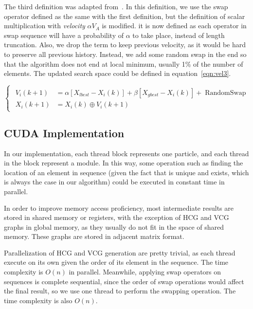 \documentclass{article}
\begin{document}
The third definition was adapted from~\cite{1259748}. In this definition, we use the swap operator defined as the same with the first definition, but the definition of scalar multiplication with \textit{velocity} $\alpha V_A$ is modified. it is now defined as each operator in swap sequence will have a probability of $\alpha$ to take place, instead of length truncation. Also, we drop the term to keep previous velocity, as it would be hard 
to preserve all previous history. Instead, we add some random swap in the end so that the algorithm does not end at local minimum, usually 1\% of the number of elements. The updated search space could be defined in equation~\ref{eqn:vel3}.

\begin{equation}
\label{eqn:vel3}
    \begin{cases}
        \begin{split}
        V_i(k+1) &= \alpha [X_{lbest}-X_i(k)]+\beta [X_{gbest}-X_i(k)]+\operatorname{RandomSwap}\\
        X_i(k+1) &= X_i(k)\oplus V_i(k+1)
        \end{split}
    \end{cases}
\end{equation}

\subsection{CUDA Implementation}
\label{sec:orgcb68fbc}
In our implementation, each thread block represents one particle, and each thread in the block represent a module. In this way, some operation such as finding the location of an element in sequence (given the fact that is unique and exists, which is always the case in
our algorithm) could be executed in constant time in parallel.

In order to improve memory access proficiency, most intermediate results are stored in shared memory or registers, with the exception of HCG and VCG graphs in global memory, as they usually do not fit in the space of shared memory. These graphs are stored in adjacent matrix format.

Parallelization of HCG and VCG generation are pretty trivial, as each thread execute on its own given the order of its element in the sequence. The time complexity is $O(n)$ in parallel. Meanwhile, applying swap operators on sequences is complete sequential, since the order of swap operations would affect the final result, so we use one thread to perform the swapping operation. The time complexity is also $O(n)$.
\end{document}
